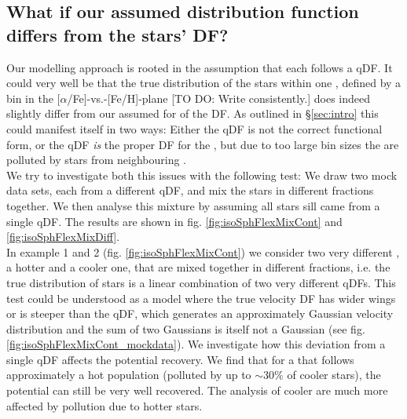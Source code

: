 \subsection{What if our assumed distribution function differs from the stars' DF?}

Our modelling approach is rooted in the assumption that each \MAP follows a qDF. It could very well be that the true distribution of the stars within one \MAP, defined by a bin in the [$\alpha$/Fe]-vs.-[Fe/H]-plane [TO DO: Write consistently.] does indeed slightly differ from our assumed for of the DF.  As outlined in \S\ref{sec:intro} this could manifest itself in two ways: Either the qDF is not the correct functional form, or the qDF \emph{is} the proper DF for the \MAP, but due to too large bin sizes the \MAPs are polluted by stars from neighbouring \MAPs.
\\We try to investigate both this issues with the following test: We draw two mock data sets, each from a different qDF, and mix the stars in different fractions together. We then analyse this mixture by assuming all stars sill came from a single qDF. The results are shown in fig. \ref{fig:isoSphFlexMixCont} and \ref{fig:isoSphFlexMixDiff}. 
\\In example 1 and 2 (fig. \ref{fig:isoSphFlexMixCont}) we consider two very different \MAPs, a hotter and a cooler one, that are mixed together in different fractions, i.e. the true distribution of stars is a linear combination of two very different qDFs. This test could be understood as a model where the true velocity DF has wider wings or is steeper than the qDF, which generates an approximately Gaussian velocity distribution and the sum of two Gaussians is itself not a Gaussian (see fig. \ref{fig:isoSphFlexMixCont_mockdata}). We investigate how this deviation from a single qDF affects the potential recovery. We find that for a \MAP that follows approximately a hot population (polluted by up to $\sim30\%$ of cooler stars), the potential can still be very well recovered. The analysis of cooler \MAPs are much more affected by pollution due to hotter stars.
